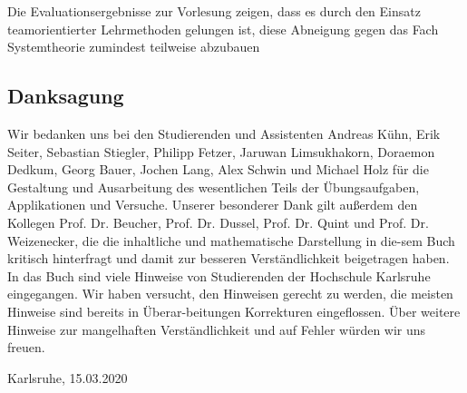 \noindent Die Evaluationsergebnisse zur Vorlesung zeigen, dass es durch den Einsatz teamorientierter Lehrmethoden gelungen ist, diese Abneigung gegen das Fach Systemtheorie zumindest teilweise abzubauen

\clearpage

\subsection{Danksagung}

Wir bedanken uns bei den Studierenden und Assistenten Andreas Kühn, Erik Seiter, Sebastian Stiegler, Philipp Fetzer, Jaruwan Limsukhakorn, Doraemon Dedkum, Georg Bauer, Jochen Lang, Alex Schwin und Michael Holz für die Gestaltung und Ausarbeitung des wesentlichen Teils der Übungsaufgaben, Applikationen und Versuche.\newline
Unserer besonderer Dank gilt außerdem den Kollegen Prof. Dr. Beucher, Prof. Dr. Dussel, Prof. Dr. Quint und Prof. Dr. Weizenecker, die die inhaltliche und mathematische Darstellung in die-sem Buch kritisch hinterfragt und damit zur besseren Verständlichkeit beigetragen haben. \newline
In das Buch sind viele Hinweise von Studierenden der Hochschule Karlsruhe eingegangen. Wir haben versucht, den Hinweisen gerecht zu werden, die meisten Hinweise sind bereits in Überar-beitungen Korrekturen eingeflossen. Über weitere Hinweise zur mangelhaften Verständlichkeit und auf Fehler würden wir uns freuen. \newline

\noindent Karlsruhe, 15.03.2020

